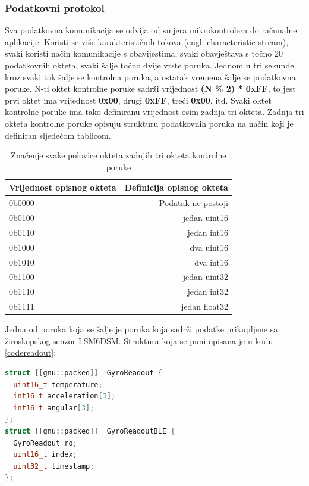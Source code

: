 \documentclass[times, utf8, diplomski]{diplomski}
\begin{document}
\subsubsection{Podatkovni protokol}
Sva podatkovna komunikacija se odvija od smjera mikrokontrolera do računalne aplikacije. Koristi se više karakterističnih tokova (engl. characteristic stream), svaki koristi način komunikacije s obavijestima, svaki obavještava s točno 20 podatkovnih okteta, svaki šalje točno dvije vrste poruka. Jednom u tri sekunde kroz svaki tok šalje se kontrolna poruka, a ostatak vremena šalje se podatkovna poruke. N-ti oktet kontrolne poruke sadrži vrijednost \textbf{(N \% 2) * 0xFF}, to jest prvi oktet ima vrijednost \textbf{0x00}, drugi \textbf{0xFF}, treći \textbf{0x00}, itd. Svaki oktet kontrolne poruke ima tako definiranu vrijednost osim zadnja tri okteta. Zadnja tri okteta kontrolne poruke opisuju strukturu podatkovnih poruka na način koji je definiran sljedećom tablicom.

\begin{table}[H]
  \begin{center}
    \begin{tabular}[c]{l|r}
      \multicolumn{1}{c|}{\textbf{Vrijednost opisnog okteta}} & 
      \multicolumn{1}{c}{\textbf{Definicija opisnog okteta}} \\
      \hline
      0b0000 & Podatak ne postoji \\
      0b0100 & jedan uint16 \\
      0b0110 & jedan int16 \\
      0b1000 & dva uint16 \\
      0b1010 & dva int16 \\
      0b1100 & jedan uint32 \\
      0b1110 & jedan int32 \\
      0b1111 & jedan float32 \\
      \hline
    \end{tabular}
  \caption{Značenje svake polovice okteta zadnjih tri okteta kontrolne poruke}
  \end{center}
\end{table}

Jedna od poruka koja se šalje je poruka koja sadrži podatke prikupljene sa žiroskopskog senzor LSM6DSM. Struktura koja se puni opisana je u kodu \ref{codereadout}:

\begin{lstlisting}[language=c++, caption = {Definicija strukture koja se šalje Bluetoothom}, label={codereadout}]
 struct [[gnu::packed]]  GyroReadout {
  uint16_t temperature;
  int16_t acceleration[3];
  int16_t angular[3];
};
struct [[gnu::packed]]  GyroReadoutBLE {
  GyroReadout ro;
  uint16_t index;
  uint32_t timestamp;
};
\end{lstlisting}
\end{document}
